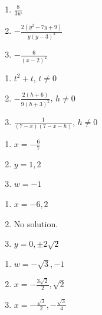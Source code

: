 \documentclass{ximera}
\begin{document}
\begin{multicols}{3}
\begin{enumerate}
\setcounter{enumi}{\value{HW}}

\item  $\frac{8}{3w}$
\item  $-\frac{2(y^2-7y+9)}{y(y-3)^2}$
\item  $-\frac{6}{(x-2)^2}$

 
\setcounter{HW}{\value{enumi}}
\end{enumerate}
\end{multicols}

\begin{multicols}{3}
\begin{enumerate}
\setcounter{enumi}{\value{HW}}

\item $t^2+t$, $t \neq 0$
\item $-\frac{2(h+6)}{9(h+3)^2}$, $h \neq 0$ 
\item $\frac{1}{(7-x)(7-x-h)}$, $h \neq 0$ 

\setcounter{HW}{\value{enumi}}
\end{enumerate}
\end{multicols}



\begin{multicols}{3}
\begin{enumerate}
\setcounter{enumi}{\value{HW}}

\item $x = -\frac{6}{7}$
\item $y = 1, 2$ 
\item $w = -1$ 

\setcounter{HW}{\value{enumi}}
\end{enumerate}
\end{multicols}

\begin{multicols}{3}
\begin{enumerate}
\setcounter{enumi}{\value{HW}}


\item $x=-6, 2$
\item No solution.
\item $y = 0, \pm 2\sqrt{2}$  

\setcounter{HW}{\value{enumi}}
\end{enumerate}
\end{multicols}

\begin{multicols}{3}
\begin{enumerate}
\setcounter{enumi}{\value{HW}}


\item $w = -\sqrt{3}, -1$
\item $x = -\frac{3\sqrt{2}}{2}, \sqrt{2}$
\item $x = -\frac{\sqrt{3}}{2}, -\frac{\sqrt{3}}{4}$

\setcounter{HW}{\value{enumi}}
\end{enumerate}
\end{multicols}
\end{document}

